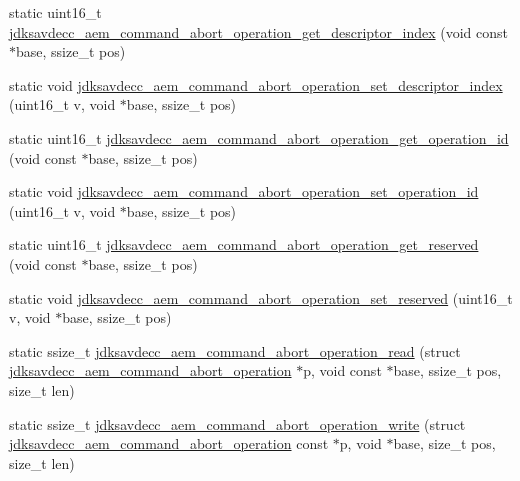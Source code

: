 \begin{DoxyCompactItemize}
\item 
static uint16\+\_\+t \hyperlink{group__command__abort__operation_ga68dfd286ab75d8f5c7c5f51a61cf9f19}{jdksavdecc\+\_\+aem\+\_\+command\+\_\+abort\+\_\+operation\+\_\+get\+\_\+descriptor\+\_\+index} (void const $\ast$base, ssize\+\_\+t pos)
\item 
static void \hyperlink{group__command__abort__operation_ga3222031dc3158d97869926f84dbd9ca1}{jdksavdecc\+\_\+aem\+\_\+command\+\_\+abort\+\_\+operation\+\_\+set\+\_\+descriptor\+\_\+index} (uint16\+\_\+t v, void $\ast$base, ssize\+\_\+t pos)
\item 
static uint16\+\_\+t \hyperlink{group__command__abort__operation_ga7a374f4cdbfb0b673e9eaf9c0ca951bc}{jdksavdecc\+\_\+aem\+\_\+command\+\_\+abort\+\_\+operation\+\_\+get\+\_\+operation\+\_\+id} (void const $\ast$base, ssize\+\_\+t pos)
\item 
static void \hyperlink{group__command__abort__operation_gacd90d92104e895f938ad1ae9fbbaf3c9}{jdksavdecc\+\_\+aem\+\_\+command\+\_\+abort\+\_\+operation\+\_\+set\+\_\+operation\+\_\+id} (uint16\+\_\+t v, void $\ast$base, ssize\+\_\+t pos)
\item 
static uint16\+\_\+t \hyperlink{group__command__abort__operation_ga3c81740d4cc7fe71d49c1940621f7551}{jdksavdecc\+\_\+aem\+\_\+command\+\_\+abort\+\_\+operation\+\_\+get\+\_\+reserved} (void const $\ast$base, ssize\+\_\+t pos)
\item 
static void \hyperlink{group__command__abort__operation_gaee0d0a83e05af775723b272a0870833f}{jdksavdecc\+\_\+aem\+\_\+command\+\_\+abort\+\_\+operation\+\_\+set\+\_\+reserved} (uint16\+\_\+t v, void $\ast$base, ssize\+\_\+t pos)
\item 
static ssize\+\_\+t \hyperlink{group__command__abort__operation_gab3b52f72552e6f7b69a0e567b3fcef57}{jdksavdecc\+\_\+aem\+\_\+command\+\_\+abort\+\_\+operation\+\_\+read} (struct \hyperlink{structjdksavdecc__aem__command__abort__operation}{jdksavdecc\+\_\+aem\+\_\+command\+\_\+abort\+\_\+operation} $\ast$p, void const $\ast$base, ssize\+\_\+t pos, size\+\_\+t len)
\item 
static ssize\+\_\+t \hyperlink{group__command__abort__operation_ga5f71451a1562c1e74842983a85c1e5a7}{jdksavdecc\+\_\+aem\+\_\+command\+\_\+abort\+\_\+operation\+\_\+write} (struct \hyperlink{structjdksavdecc__aem__command__abort__operation}{jdksavdecc\+\_\+aem\+\_\+command\+\_\+abort\+\_\+operation} const $\ast$p, void $\ast$base, size\+\_\+t pos, size\+\_\+t len)
\end{DoxyCompactItemize}


